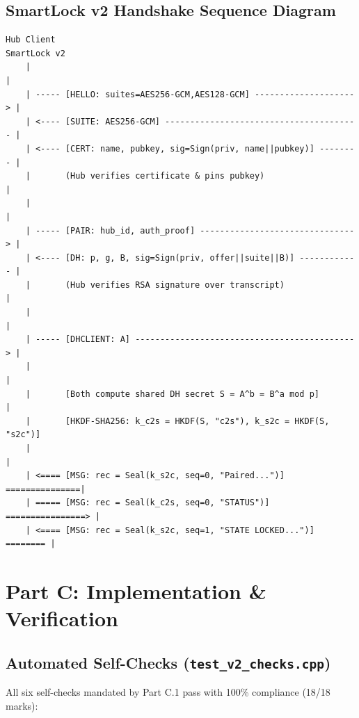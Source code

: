\documentclass[11pt,a4paper]{article}
\begin{document}
\subsection{SmartLock v2 Handshake Sequence Diagram}
\begin{center}
\begin{lstlisting}
Hub Client                                                        SmartLock v2
    |                                                                   |
    | ----- [HELLO: suites=AES256-GCM,AES128-GCM] --------------------> |
    | <---- [SUITE: AES256-GCM] --------------------------------------- |
    | <---- [CERT: name, pubkey, sig=Sign(priv, name||pubkey)] -------- |
    |       (Hub verifies certificate & pins pubkey)                    |
    |                                                                   |
    | ----- [PAIR: hub_id, auth_proof] -------------------------------> |
    | <---- [DH: p, g, B, sig=Sign(priv, offer||suite||B)] ------------ |
    |       (Hub verifies RSA signature over transcript)                |
    |                                                                   |
    | ----- [DHCLIENT: A] --------------------------------------------> |
    |                                                                   |
    |       [Both compute shared DH secret S = A^b = B^a mod p]         |
    |       [HKDF-SHA256: k_c2s = HKDF(S, "c2s"), k_s2c = HKDF(S, "s2c")]
    |                                                                   |
    | <==== [MSG: rec = Seal(k_s2c, seq=0, "Paired...")] ===============|
    | ===== [MSG: rec = Seal(k_c2s, seq=0, "STATUS")] ================> |
    | <==== [MSG: rec = Seal(k_s2c, seq=1, "STATE LOCKED...")] ======== |
\end{lstlisting}
\end{center}

\newpage

\section{Part C: Implementation \& Verification}

\subsection{Automated Self-Checks (\texttt{test\_v2\_checks.cpp})}
All six self-checks mandated by Part C.1 pass with 100\% compliance (18/18 marks):
\end{document}
